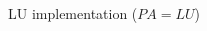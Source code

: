 \begin{frame}{LU implementation ($PA=LU$)}
\begin{columns}[c]
\begin{column}{0.35\textwidth}
    \end{column}
  \end{columns}

\end{frame}

%
%

